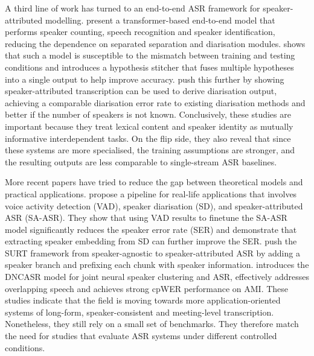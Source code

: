A third line of work has turned to an end-to-end ASR framework for speaker-attributed modelling. \citet{kanda2021endtoendspeakerattributedasrtransformer} present a transformer-based end-to-end model that performs speaker counting, speech recognition and speaker identification, reducing the dependence on separated separation and diarisation modules. \citet{chang2021hypothesisstitcherendtoendspeakerattributed} shows that such a model is susceptible to the mismatch between training and testing conditions and introduces a hypothesis stitcher that fuses multiple hypotheses into a single output to help improve accuracy. \citet{kanda2022transcribetodiarizeneuralspeakerdiarization} push this further by showing speaker-attributed transcription can be used to derive diarisation output, achieving a comparable diarisation error rate to existing diarisation methods and better if the number of speakers is not known. Conclusively, these studies are important because they treat lexical content and speaker identity as mutually informative interdependent tasks. On the flip side, they also reveal that since these systems are more specialised, the training assumptions are stronger, and the resulting outputs are less comparable to single-stream ASR baselines.

More recent papers have tried to reduce the gap between theoretical models and practical applications. \citet{cui2024improvingspeakerassignmentspeakerattributed} propose a pipeline for real-life applications that involves voice activity detection (VAD), speaker diarisation (SD), and speaker-attributed ASR (SA-ASR). They show that using VAD results to finetune the SA-ASR model significantly reduces the speaker error rate (SER) and demonstrate that extracting speaker embedding from SD can further improve the SER. \citet{raj2024speakerattributionsurt} push the SURT framework from speaker-agnostic to speaker-attributed ASR by adding a speaker branch and prefixing each chunk with speaker information. \citet{zheng2025dncasrendtoendtrainingspeakerattributed} introduces the DNCASR model for joint neural speaker clustering and ASR, effectively addresses overlapping speech and achieves strong cpWER performance on AMI. These studies indicate that the field is moving towards more application-oriented systems of long-form, speaker-consistent and meeting-level transcription. Nonetheless, they still rely on a small set of benchmarks. They therefore match the need for studies that evaluate ASR systems under different controlled conditions.

